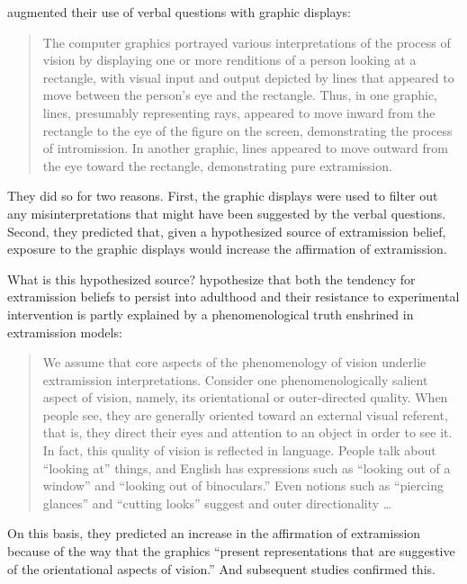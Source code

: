\citet{Winer:1996as} augmented their use of verbal questions with graphic displays:
\begin{quote}
	The computer graphics portrayed various interpretations of the process of vision by displaying one or more renditions of a person looking at a rectangle, with visual input and output depicted by lines that appeared to move between the person's eye and the rectangle. Thus, in one graphic, lines, presumably representing rays, appeared to move inward from the rectangle to the eye of the figure on the screen, demonstrating the process of intromission. In another graphic, lines appeared to move outward from the eye toward the rectangle, demonstrating pure extramission. \citep[139]{Winer:1996as}
\end{quote}
They did so for two reasons. First, the graphic displays were used to filter out any misinterpretations that might have been suggested by the verbal questions. Second, they predicted that, given a hypothesized source of extramission belief, exposure to the graphic displays would increase the affirmation of extramission.

What is this hypothesized source? \citet{Winer:1996as} hypothesize that both the tendency for extramission beliefs to persist into adulthood and their resistance to experimental intervention is partly explained by a phenomenological truth enshrined in extramission models:
\begin{quote}
	We assume that core aspects of the phenomenology of vision underlie extramission interpretations. Consider one phenomenologically salient aspect of vision, namely, its orientational or outer-directed quality. When people see, they are generally oriented toward an external visual referent, that is, they direct their eyes and attention to an object in order to see it. In fact, this quality of vision is reflected in language. People talk about ``looking at'' things, and English has expressions such as ``looking out of a window'' and ``looking out of binoculars.'' Even notions such as ``piercing glances'' and ``cutting looks'' suggest and outer directionality \ldots\ \citep[140]{Winer:1996as}
\end{quote}
On this basis, they predicted an increase in the affirmation of extramission because of the way that the graphics ``present representations that are suggestive of the orientational aspects of vision.'' And subsequent studies confirmed this.

